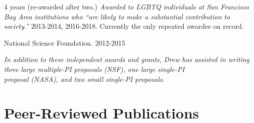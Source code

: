 \documentclass[letterpaper]{deedy-resume} %
\begin{document}
{\begin{etaremune}
\item {} 4 years (re-awarded after two.) {\it Awarded to LGBTQ individuals at San Francisco Bay Area institutions who ``are likely to make a substantial contribution to society.''} 2013-2014, 2016-2018. Currently the only repeated awardee on record.

\item {} National Science Foundation. 2012-2015

\end{etaremune}

\vspace{-0.2cm}
\hspace{1cm} {\small \it *In addition to these independent awards and grants, Drew has assisted in writing three large multiple-PI proposals (NSF), one large single-PI\\ \hspace{1cm} proposal (NASA), and two small single-PI proposals.}



%
%
%
%


\vspace{0.2cm}
\section{Peer-Reviewed Publications}
\vspace{0.2cm}

}
\end{document}
